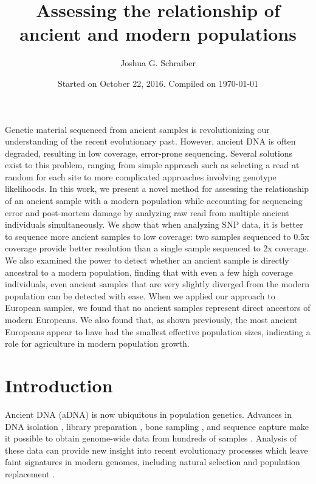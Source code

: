 \documentclass[11pt, oneside]{article}   	%
\title{Assessing the relationship of ancient and modern populations}
\author{Joshua G. Schraiber}
\date{Started on October 22, 2016. Compiled on \today}							%
\begin{document}
\maketitle

\abstract
Genetic material sequenced from ancient samples is revolutionizing our understanding of the recent evolutionary past. However, ancient DNA is often degraded, resulting in low coverage, error-prone sequencing. Several solutions exist to this problem, ranging from simple approach such as selecting a read at random for each site to more complicated approaches involving genotype likelihoods. In this work, we present a novel method for assessing the relationship of an ancient sample with a modern population while accounting for sequencing error and post-mortem damage by analyzing raw read from multiple ancient individuals simultaneously. We show that when analyzing SNP data, it is better to sequence more ancient samples to low coverage: two samples sequenced to 0.5x coverage provide better resolution than a single sample sequenced to 2x coverage. We also examined the power to detect whether an ancient sample is directly ancestral to a modern population, finding that with even a few high coverage individuals, even ancient samples that are very slightly diverged from the modern population can be detected with ease. When we applied our approach to European samples, we found that no ancient samples represent direct ancestors of modern Europeans. We also found that, as shown previously, the most ancient Europeans appear to have had the smallest effective population sizes, indicating a role for agriculture in modern population growth.

\section{Introduction}
Ancient DNA (aDNA) is now ubiquitous in population genetics. Advances in DNA isolation \citep{dabney2013ancient}, library preparation \citep{meyer2012high}, bone sampling \citep{pinhasi2015optimal}, and sequence capture \cite{haak2015massive} make it possible to obtain genome-wide data from hundreds of samples \citep{haak2015massive, mathieson2015genome, allentoft2015population, fu2016genetic}. Analysis of these data can provide new insight into recent evolutionary processes which leave faint signatures in modern genomes, including natural selection \citep{schraiber2016bayesian, jewett2016effects} and population replacement \citep{sjodin2014assessing, lazaridis2014ancient}. 
\end{document}
